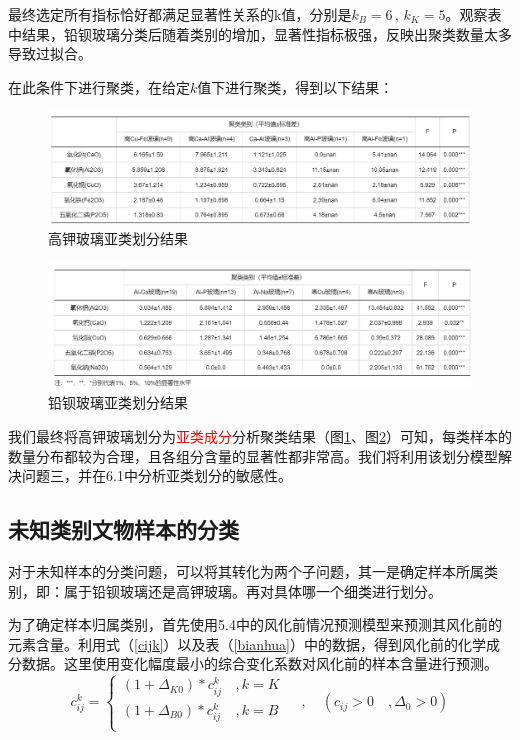 \documentclass{my_paper}
\begin{document}
最终选定所有指标恰好都满足显著性关系的k值，分别是$k_B = 6\,,\,k_K = 5$。观察表中结果，铅钡玻璃分类后随着类别的增加，显著性指标极强，反映出聚类数量太多导致过拟合。

在此条件下进行聚类，在给定$k$值下进行聚类，得到以下结果：
\begin {figure}[h]
\centering %
\includegraphics[width=\textwidth]{kkres.png}
\caption{高钾玻璃亚类划分结果} %
\label{kkres}
\end {figure}
\begin {figure}[h]
\centering %
\includegraphics[width=\textwidth]{kbres.png}
\caption{铅钡玻璃亚类划分结果} %
\label{kbres}
\end {figure}

\newpage
我们最终将高钾玻璃划分为\textcolor{red}{亚类成分}分析聚类结果（图\ref{kkres}、图\ref{kbres}）可知，每类样本的数量分布都较为合理，且各组分含量的显著性都非常高。我们将利用该划分模型解决问题三，并在6.1中分析亚类划分的敏感性。

\subsection{未知类别文物样本的分类}

对于未知样本的分类问题，可以将其转化为两个子问题，其一是确定样本所属类别，即：属于铅钡玻璃还是高钾玻璃。再对具体哪一个细类进行划分。

为了确定样本归属类别，首先使用5.4中的风化前情况预测模型来预测其风化前的元素含量。利用式（\ref{cijk}）以及表（\ref{bianhua}）中的数据，得到风化前的化学成分数据。这里使用变化幅度最小的综合变化系数对风化前的样本含量进行预测。
$$    c_{ij}^k = \begin{cases}
  (1+\Delta_{K0})*c_{ij}^k&\,,k=K\\
  (1+\Delta_{B0})*c_{ij}^k&\,,k=B\\
\end{cases} \, \quad , \quad (c_{ij}>0\quad ,\Delta_0 > 0)$$
\end{document}
